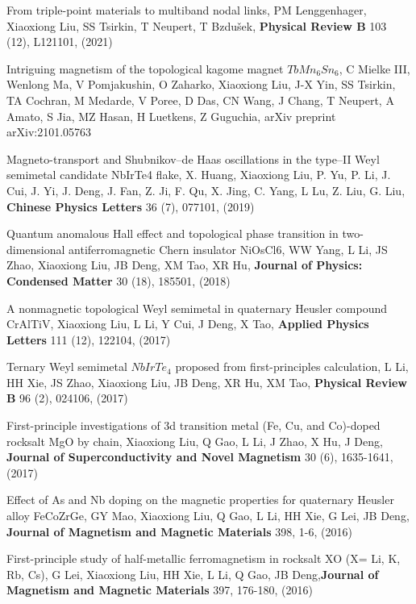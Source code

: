 \documentclass[11pt,a4paper,sans]{moderncv} %
\begin{document}
\begin{etaremune}
  \item From triple-point materials to multiband nodal links, PM Lenggenhager, \textcolor{cvblue}{Xiaoxiong Liu}, SS Tsirkin, T Neupert, T Bzdušek, \textbf{Physical Review B} 103 (12), L121101, (2021)
  \item Intriguing magnetism of the topological kagome magnet $TbMn_6Sn_6$, C Mielke III, Wenlong Ma, V Pomjakushin, O Zaharko, \textcolor{cvblue}{Xiaoxiong Liu}, J-X Yin, SS Tsirkin, TA Cochran, M Medarde, V Poree, D Das, CN Wang, J Chang, T Neupert, A Amato, S Jia, MZ Hasan, H Luetkens, Z Guguchia, arXiv preprint arXiv:2101.05763
  \item Magneto-transport and Shubnikov–de Haas oscillations in the type–II Weyl semimetal candidate NbIrTe4 flake, X. Huang, \textcolor{cvblue}{Xiaoxiong Liu}, P. Yu, P. Li, J. Cui, J. Yi, J. Deng, J. Fan, Z. Ji, F. Qu, X. Jing, C. Yang, L Lu, Z. Liu, G. Liu, \textbf{Chinese Physics Letters} 36 (7), 077101, (2019)
  \item Quantum anomalous Hall effect and topological phase transition in two-dimensional antiferromagnetic Chern insulator NiOsCl6, WW Yang, L Li, JS Zhao, \textcolor{cvblue}{Xiaoxiong Liu}, JB Deng, XM Tao, XR Hu, \textbf{Journal of Physics: Condensed Matter} 30 (18), 185501, (2018)
  \item A nonmagnetic topological Weyl semimetal in quaternary Heusler compound CrAlTiV, \textcolor{cvblue}{Xiaoxiong Liu}, L Li, Y Cui, J Deng, X Tao, \textbf{Applied Physics Letters} 111 (12), 122104, (2017)
  \item Ternary Weyl semimetal $NbIrTe_4$ proposed from first-principles calculation, L Li, HH Xie, JS Zhao, \textcolor{cvblue}{Xiaoxiong Liu}, JB Deng, XR Hu, XM Tao, \textbf{Physical Review B} 96 (2), 024106, (2017)
  \item First-principle investigations of 3d transition metal (Fe, Cu, and Co)-doped rocksalt MgO by chain, \textcolor{cvblue}{Xiaoxiong Liu}, Q Gao, L Li, J Zhao, X Hu, J Deng, \textbf{Journal of Superconductivity and Novel Magnetism} 30 (6), 1635-1641, (2017)
  \item Effect of As and Nb doping on the magnetic properties for quaternary Heusler alloy FeCoZrGe, GY Mao, \textcolor{cvblue}{Xiaoxiong Liu}, Q Gao, L Li, HH Xie, G Lei, JB Deng, \textbf{Journal of Magnetism and Magnetic Materials} 398, 1-6, (2016)
  \item First-principle study of half-metallic ferromagnetism in rocksalt XO (X= Li, K, Rb, Cs), G Lei, \textcolor{cvblue}{Xiaoxiong Liu}, HH Xie, L Li, Q Gao, JB Deng,\textbf{Journal of Magnetism and Magnetic Materials} 397, 176-180, (2016)

\end{etaremune}









\end{document}
